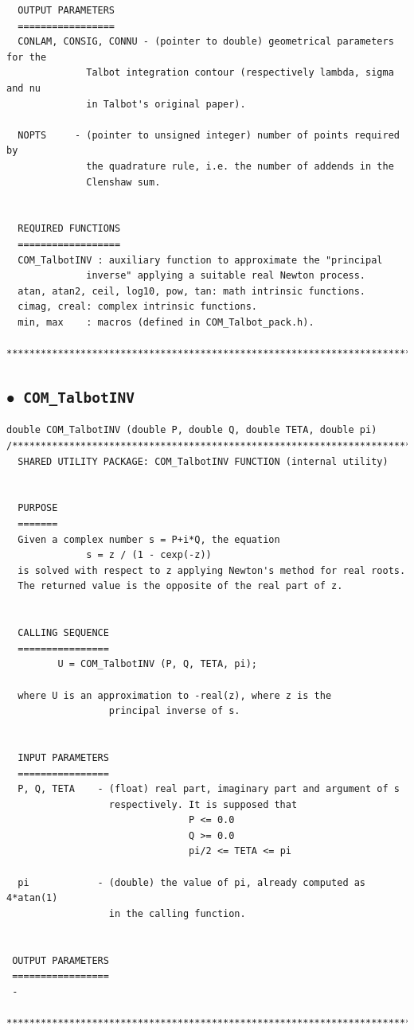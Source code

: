 \documentclass[a4paper,10pt]{report}%
\begin{document}
\begin{lstlisting}
  OUTPUT PARAMETERS
  =================
  CONLAM, CONSIG, CONNU - (pointer to double) geometrical parameters for the
              Talbot integration contour (respectively lambda, sigma and nu
              in Talbot's original paper).

  NOPTS     - (pointer to unsigned integer) number of points required by
              the quadrature rule, i.e. the number of addends in the
              Clenshaw sum.


  REQUIRED FUNCTIONS
  ==================
  COM_TalbotINV : auxiliary function to approximate the "principal
              inverse" applying a suitable real Newton process.
  atan, atan2, ceil, log10, pow, tan: math intrinsic functions.
  cimag, creal: complex intrinsic functions.
  min, max    : macros (defined in COM_Talbot_pack.h).

*****************************************************************************\
\end{lstlisting}


\subsection{\texorpdfstring{$\boldsymbol{\bullet}$}{ - }{\tt\ COM\_TalbotINV}}
\begin{lstlisting}
double COM_TalbotINV (double P, double Q, double TETA, double pi)
/*****************************************************************************
  SHARED UTILITY PACKAGE: COM_TalbotINV FUNCTION (internal utility)


  PURPOSE
  =======
  Given a complex number s = P+i*Q, the equation
              s = z / (1 - cexp(-z))
  is solved with respect to z applying Newton's method for real roots.
  The returned value is the opposite of the real part of z.


  CALLING SEQUENCE
  ================
         U = COM_TalbotINV (P, Q, TETA, pi);

  where U is an approximation to -real(z), where z is the
                  principal inverse of s.


  INPUT PARAMETERS
  ================
  P, Q, TETA    - (float) real part, imaginary part and argument of s
                  respectively. It is supposed that
                                P <= 0.0
                                Q >= 0.0
                                pi/2 <= TETA <= pi

  pi            - (double) the value of pi, already computed as 4*atan(1)
                  in the calling function.


 OUTPUT PARAMETERS
 =================
 -

*****************************************************************************\
\end{lstlisting}
\end{document}
